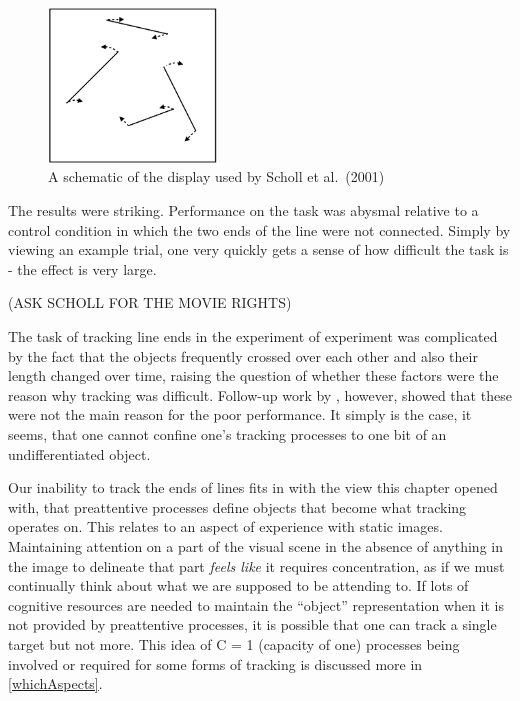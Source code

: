\documentclass[
]{book}
\begin{document}
\begin{figure}
\centering
\includegraphics[width=0.4\textwidth,height=\textheight]{imagesForRmd/linesSchollPylyshynFeldman_madeByHolcombe.png}
\caption{A schematic of the display used by Scholl et al.~(2001)}
\end{figure}

The results were striking. Performance on the task was abysmal relative to a control condition in which the two ends of the line were not connected. Simply by viewing an example trial, one very quickly gets a sense of how difficult the task is - the effect is very large.

(ASK SCHOLL FOR THE MOVIE RIGHTS)

The task of tracking line ends in the experiment of \citet{schollWhatVisualObject2001} experiment was complicated by the fact that the objects frequently crossed over each other and also their length changed over time, raising the question of whether these factors were the reason why tracking was difficult. Follow-up work by \citet{howeCanAttentionBe2012}, however, showed that these were not the main reason for the poor performance. It simply is the case, it seems, that one cannot confine one's tracking processes to one bit of an undifferentiated object.

Our inability to track the ends of lines fits in with the view this chapter opened with, that preattentive processes define objects that become what tracking operates on. This relates to an aspect of experience with static images. Maintaining attention on a part of the visual scene in the absence of anything in the image to delineate that part \emph{feels like} it requires concentration, as if we must continually think about what we are supposed to be attending to. If lots of cognitive resources are needed to maintain the ``object'' representation when it is not provided by preattentive processes, it is possible that one can track a single target but not more. This idea of C = 1 (capacity of one) processes being involved or required for some forms of tracking is discussed more in \ref{whichAspects}.
\end{document}
